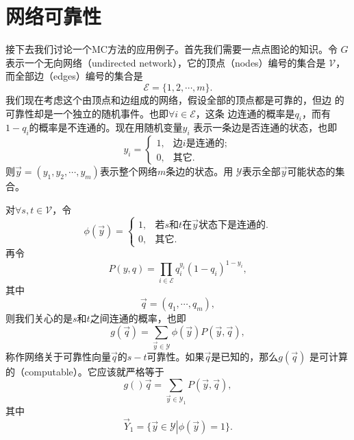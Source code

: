 \section{网络可靠性}

接下去我们讨论一个MC方法的应用例子。首先我们需要一点点图论的知识。令
$G$表示一个无向网络（undirected network），它的顶点（nodes）编号的集合是
$\mathscr{V}$，而全部边（edges）编号的集合是
$$
\mathscr{E} = \{1, 2, \cdots, m\}.
$$
我们现在考虑这个由顶点和边组成的网络，假设全部的顶点都是可靠的，但边
的可靠性却是一个独立的随机事件。也即$\forall i \in \mathscr{E}$，这条
边连通的概率是$q_i$，而有$1 - q_i$的概率是不连通的。现在用随机变量$y_i$
表示一条边是否连通的状态，也即
$$
y_i = \left\{
\begin{array}{ll}
  1, & \mbox{边$i$是连通的};\\
  0, & \mbox{其它}.
\end{array}
\right.
$$
则$\vec{y} = (y_1, y_2, \cdots, y_m)$表示整个网络$m$条边的状态。用
$\mathscr{Y}$表示全部$\vec{y}$可能状态的集合。

对$\forall s, t \in \mathscr{V}$，令
$$
\phi(\vec{y}) = \left\{
\begin{array}{ll}
  1, & \mbox{若$s$和$t$在$\vec{y}$状态下是连通的}.\\
  0, & \mbox{其它}.
\end{array}
\right.
$$
再令
$$
P(y, q) = \prod_{i \in \mathscr{E}} q_i^{y_i}(1 - q_i)^{1 - y_i},
$$
其中
$$
\vec{q} = (q_1, \cdots, q_m),
$$
则我们关心的是$s$和$t$之间连通的概率，也即
\begin{equation}
  g(\vec{q}) = \sum_{\vec{y} \in \mathscr{Y}} \phi(\vec{y}) P(\vec{y}, \vec{q}),
\end{equation}
称作网络关于可靠性向量$\vec{q}$的$s-t$可靠性。如果$\vec{q}$是已知的，那么$g(\vec{q})$
是可计算的（computable）。它应该就严格等于
\begin{equation}
  g()\vec{q} = \sum_{\vec{y} \in \mathscr{Y}_1} P(\vec{y}, \vec{q}),
\end{equation}
其中
$$
\vec{Y}_1 = \{\vec{y} \in \mathscr{Y} \left| \phi(\vec{y}) = 1\right.\}.
$$
